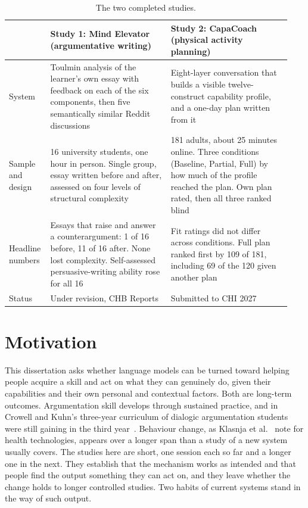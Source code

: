 \documentclass[manuscript,screen,review]{acmart}
\begin{document}
\begin{table}[t]
\caption{The two completed studies.}
\label{tab:studies}
\small
\setlength{\tabcolsep}{5pt}
\begin{tabular}{@{}p{0.12\linewidth}p{0.41\linewidth}p{0.41\linewidth}@{}}
\toprule
 & \textbf{Study 1: Mind Elevator} (argumentative writing) & \textbf{Study 2: CapaCoach} (physical activity planning) \\
\midrule
System & Toulmin analysis of the learner's own essay with feedback on each of the six components, then five semantically similar Reddit discussions & Eight-layer conversation that builds a visible twelve-construct capability profile, and a one-day plan written from it \\
\addlinespace
Sample and design & 16 university students, one hour in person. Single group, essay written before and after, assessed on four levels of structural complexity & 181 adults, about 25 minutes online. Three conditions (Baseline, Partial, Full) by how much of the profile reached the plan. Own plan rated, then all three ranked blind \\
\addlinespace
Headline numbers & Essays that raise and answer a counterargument: 1 of 16 before, 11 of 16 after. None lost complexity. Self-assessed persuasive-writing ability rose for all 16 & Fit ratings did not differ across conditions. Full plan ranked first by 109 of 181, including 69 of the 120 given another plan \\
\addlinespace
Status & Under revision, CHB Reports & Submitted to CHI 2027 \\
\bottomrule
\end{tabular}
\end{table}

\section{Motivation}

This dissertation asks whether language models can be turned toward helping people acquire a skill and act on what they can genuinely do, given their capabilities and their own personal and contextual factors. Both are long-term outcomes. Argumentation skill develops through sustained practice, and in Crowell and Kuhn's three-year curriculum of dialogic argumentation students were still gaining in the third year~\cite{crowell2014developing}. Behaviour change, as Klasnja et al.~\cite{klasnja2011evaluate} note for health technologies, appears over a longer span than a study of a new system usually covers. The studies here are short, one session each so far and a longer one in the next. They establish that the mechanism works as intended and that people find the output something they can act on, and they leave whether the change holds to longer controlled studies. Two habits of current systems stand in the way of such output.
\end{document}
